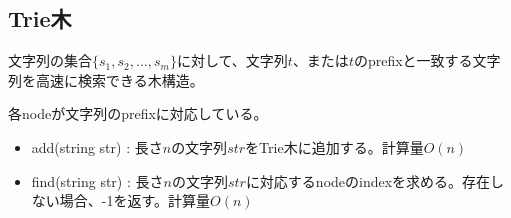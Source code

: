 \subsection{Trie木}

文字列の集合$\{s_1, s_2, \ldots, s_m \}$に対して、文字列$t$、または$t$のprefixと一致する文字列を高速に検索できる木構造。

各nodeが文字列のprefixに対応している。

\begin{itemize}
    \item add(string str) : 長さ$n$の文字列$\mathit{str}$をTrie木に追加する。計算量$O(n)$
    \item find(string str) : 長さ$n$の文字列$\mathit{str}$に対応するnodeのindexを求める。存在しない場合、-1を返す。計算量$O(n)$
\end{itemize}

